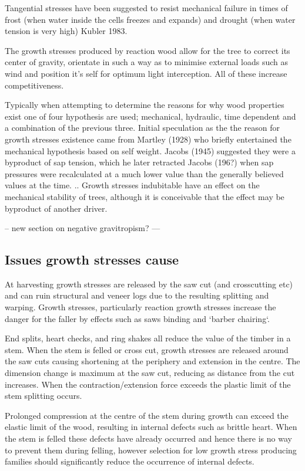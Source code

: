 \documentclass{article}
\begin{document}
Tangential stresses have been suggested to resist mechanical failure in times of
frost (when water inside the cells freezes and expands) and drought (when water
tension is very high) Kubler 1983.

The growth stresses produced by reaction wood allow for the tree to correct its
center of gravity, orientate in such a way as to minimise external loads such as
wind and position it's self for optimum light interception. All of these
increase competitiveness.

Typically when attempting to determine the reasons for why wood properties exist
one of four hypothesis are used; mechanical, hydraulic, time dependent and a
combination of the previous three. Initial speculation as the the reason for
growth stresses existence came from Martley (1928) who briefly entertained the
mechanical hypothesis based on self weight. Jacobs (1945) suggested they were a
byproduct of sap tension, which he later retracted Jacobs (196?) when sap
pressures were recalculated at a much lower value than the generally believed
values at the time. .. Growth stresses indubitable have an effect on the
mechanical stability of trees, although it is conceivable that the effect may be
byproduct of another driver.

-- new section on negative gravitropism? ---

\subsection{Issues growth stresses cause }

At harvesting growth stresses are released by the saw cut (and crosscutting etc)
and can ruin structural and veneer logs due to the resulting splitting and
warping. Growth stresses, particularly reaction growth stresses increase the
danger for the faller by effects such as saws binding and `barber chairing`.

End splits, heart checks, and ring shakes all reduce the value of the timber in
a stem. When the stem is felled or cross cut, growth stresses are released
around the saw cuts causing shortening at the periphery and extension in the
centre. The dimension change is maximum at the saw cut, reducing as distance
from the cut increases. When the contraction/extension force exceeds the plastic
limit of the stem splitting occurs.

Prolonged compression at the centre of the stem during growth can exceed the
elastic limit of the wood, resulting in internal defects such as brittle heart.
When the stem is felled these defects have already occurred and hence there is
no way to prevent them during felling, however selection for low growth stress
producing families should significantly reduce the occurrence of internal
defects.
\end{document}
